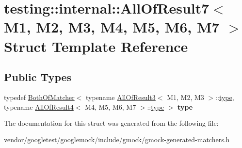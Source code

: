 \hypertarget{structtesting_1_1internal_1_1_all_of_result7}{}\section{testing\+:\+:internal\+:\+:All\+Of\+Result7$<$ M1, M2, M3, M4, M5, M6, M7 $>$ Struct Template Reference}
\label{structtesting_1_1internal_1_1_all_of_result7}
\subsection*{Public Types}
\begin{DoxyCompactItemize}
\item 
\mbox{\label{structtesting_1_1internal_1_1_all_of_result7_a47ab0d670258434b0e65530591948e8c}} 
typedef \hyperlink{classtesting_1_1internal_1_1_both_of_matcher}{Both\+Of\+Matcher}$<$ typename \hyperlink{structtesting_1_1internal_1_1_all_of_result3}{All\+Of\+Result3}$<$ M1, M2, M3 $>$\+::\hyperlink{classtesting_1_1internal_1_1_both_of_matcher}{type}, typename \hyperlink{structtesting_1_1internal_1_1_all_of_result4}{All\+Of\+Result4}$<$ M4, M5, M6, M7 $>$\+::\hyperlink{classtesting_1_1internal_1_1_both_of_matcher}{type} $>$ {\bfseries type}
\end{DoxyCompactItemize}


The documentation for this struct was generated from the following file\+:\begin{DoxyCompactItemize}
\item 
vendor/googletest/googlemock/include/gmock/gmock-\/generated-\/matchers.\+h\end{DoxyCompactItemize}
